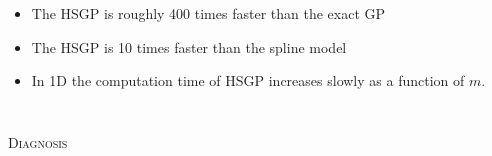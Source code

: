 \documentclass[8pt]{beamer} %
\begin{document}
\begin{frame}
\begin{columns}
 \begin{itemize}\setlength\itemsep{1.5mm}
 \small
\item The HSGP is roughly 400 times faster than the exact GP
\item The HSGP is 10 times faster than the spline model 
\item In 1D the computation time of HSGP increases slowly as a function of $m$.
 \end{itemize}

\end{columns}
\end{frame}

\begin{frame}

\textsc{\small Diagnosis}

\begin{columns}


\end{columns}
\end{frame}
\end{document}
